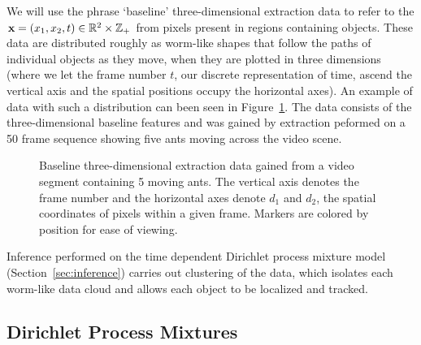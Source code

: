 \documentclass[smallcondensed, final]{svjour3}
\begin{document}
We will use the phrase `baseline' three-dimensional extraction data to refer to the $\bold{x} = ( x_{1}, x_{2}, t ) \in \mathbb{R}^{2} \times \mathbb{Z}_{+}$ from pixels present in regions containing objects. These data are distributed roughly as worm-like shapes that follow the paths of individual objects as they move, when they are plotted in three dimensions (where we let the frame number $t$, our discrete representation of time, ascend the vertical axis and the spatial positions occupy the horizontal axes). An example of data with such a distribution can been seen in Figure~\ref{fig:baselinedata}. The data consists of the three-dimensional baseline features and was gained by extraction peformed on a 50 frame sequence showing five ants moving across the video scene.
\begin{figure}[h]
        \caption{\label{fig:baselinedata} Baseline three-dimensional extraction data gained from a video segment containing 5 moving ants. The vertical axis denotes the frame number and the horizontal axes denote $d_{1}$ and $d_{2}$, the spatial coordinates of pixels within a given frame. Markers are colored by position for ease of viewing.}
\end{figure}
Inference performed on the time dependent Dirichlet process mixture model (Section~\ref{sec:inference}) carries out clustering of the data, which isolates each worm-like data cloud and allows each object to be localized and tracked.






\subsection{Dirichlet Process Mixtures}
\end{document}
